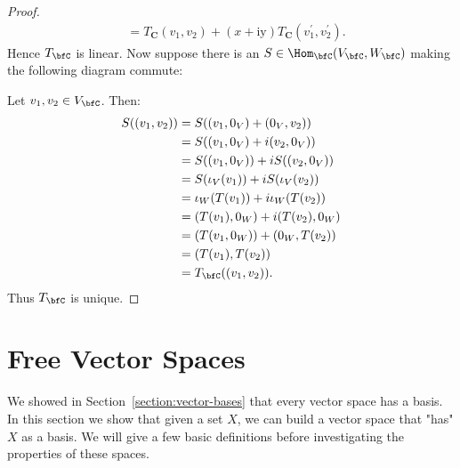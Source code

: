 \begin{proof}
\begin{equation*}
\begin{aligned}
                & =T_{\mathbf{C}}\left(v_1, v_2\right)+(x+\mathrm{iy}) T_{\mathbf{C}}\left(v_1^{\prime}, v_2^{\prime}\right) .
                \end{aligned}
                \end{equation*}
            Hence $T_\bfC$ is linear. Now suppose there is an $S \in \Hom_\bfC(V_\bfC,W_\bfC)$ making the following diagram commute:
                \begin{center}
                \end{center}
            Let $v_1,v_2 \in V_\bfC$. Then:
                \begin{equation*}
                \begin{split}
                    S((v_1,v_2))
                    & = S((v_1,0_V) + (0_V,v_2)) \\
                    & = S((v_1,0_V) + i(v_2,0_V)) \\
                    & = S((v_1,0_V)) + iS((v_2,0_V)) \\
                    & = S(\iota_V(v_1)) + iS(\iota_V(v_2)) \\
                    & = \iota_W(T(v_1)) + i \iota_W(T(v_2)) \\
                    & = (T(v_1),0_W) + i(T(v_2),0_W) \\
                    & = (T(v_1,0_W)) + (0_W,T(v_2)) \\
                    & = (T(v_1),T(v_2)) \\
                    & = T_\bfC((v_1,v_2)).
                \end{split}
                \end{equation*}
            Thus $T_\bfC$ is unique.
        \end{proof}

\section{Free Vector Spaces}
    We showed in Section~\ref{section:vector-bases} that every vector space has a basis. In this section we show that given a set $X$, we can build a vector space that "has" $X$ as a basis. We will give a few basic definitions before investigating the properties of these spaces.


